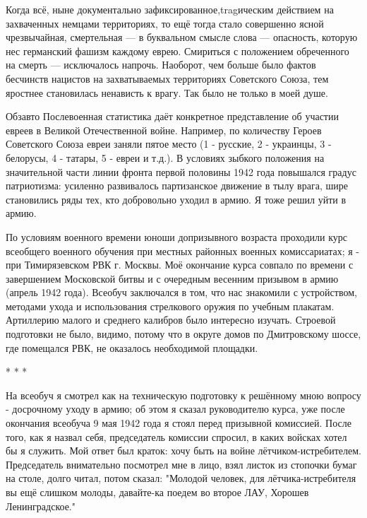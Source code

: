 \label{246-1}
Когда всё, ныне документально зафиксированное,tragическим действием на захваченных немцами территориях, то ещё тогда стало совершенно ясной чрезвычайная, смертельная — в буквальном смысле слова — опасность, которую нес германский фашизм каждому еврею.
Смириться с положением обреченного на смерть — исключалось напрочь. Наоборот, чем больше было фактов бесчинств нацистов на захватываемых территориях Советского Союза, тем яростнее становилась ненависть к врагу. Так было не только в моей душе.

\label{247-1}
Обзавто
Послевоенная статистика даёт конкретное представление об участии евреев в Великой Отечественной войне. Например, по количеству Героев Советского Союза евреи заняли пятое место (1 - русские, 2 - украинцы, 3 - белорусы, 4 - татары, 5 - евреи и т.д.). В условиях зыбкого положения на значительной части линии фронта первой половины 1942 года повышался градус патриотизма: усиленно развивалось партизанское движение в тылу врага, шире становились ряды тех, кто добровольно уходил в армию. Я тоже решил уйти в армию.

\label{248-1}
По условиям военного времени юноши допризывного возраста проходили курс всеобщего военного обучения при местных районных военных комиссариатах; я - при Тимирязевском РВК г. Москвы. Моё окончание курса совпало по времени с завершением Московской битвы и с очередным весенним призывом в армию (апрель 1942 года). Всеобуч заключался в том, что нас знакомили с устройством, методами ухода и использования стрелкового оружия по учебным плакатам. Артиллерию малого и среднего калибров было интересно изучать. Строевой подготовки не было, видимо, потому что в округе домов по Дмитровскому шоссе, где помещался РВК, не оказалось необходимой площадки.

* * *

\label{249-1}
На всеобуч я смотрел как на техническую подготовку к решённому мною вопросу - досрочному уходу в армию; об этом я сказал руководителю курса, уже после окончания всеобуча 9 мая 1942 года я стоял перед призывной комиссией. После того, как я назвал себя, председатель комиссии спросил, в каких войсках хотел бы я служить. Мой ответ был краток: хочу быть на войне лётчиком-истребителем. Председатель внимательно посмотрел мне в лицо, взял листок из стопочки бумаг на столе, долго читал, потом сказал: "Молодой человек, для лётчика-истребителя вы ещё слишком молоды, давайте-ка поедем во второе ЛАУ, Хорошев Ленинградское."

